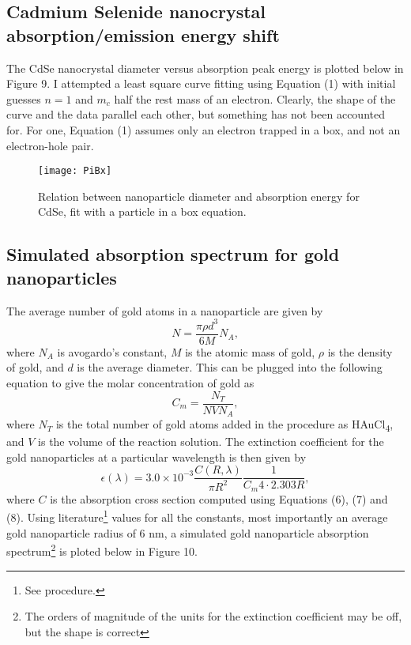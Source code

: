 \documentclass{article}
\begin{document}
\subsection{Cadmium Selenide nanocrystal absorption/emission energy shift}

The CdSe nanocrystal diameter versus absorption peak energy is plotted below in Figure 9.
I attempted a least square curve fitting using Equation (1) with initial guesses $n=1$ and
$m_c$ half the rest mass of an electron. Clearly, the shape of the curve and the data
parallel each other, but something has not been accounted for. For one, Equation (1) assumes
only an electron trapped in a box, and not an electron-hole pair.

\begin{figure}[H]
\texttt{[image: PiBx]}
\centering
\caption{Relation between nanoparticle diameter and absorption energy for CdSe, fit with
a particle in a box equation.}
\end{figure}

\subsection{Simulated absorption spectrum for gold nanoparticles}

The average number of gold atoms in a nanoparticle are given by
\begin{equation}
N=\frac{\pi\rho d^3}{6 M} N_A,
\end{equation}
where $N_A$ is avogardo's constant, $M$ is the atomic mass of gold, $\rho$ is the density
of gold, and $d$ is the average diameter. This can be plugged into the following equation
to give the molar concentration of gold as
\begin{equation}
C_m=\frac{N_T}{N V N_A},
\end{equation}
where $N_T$ is the total number of gold atoms added in the procedure as
HAuCl\textsubscript{4}, and $V$ is the volume of the reaction solution.
The extinction coefficient for the gold nanoparticles at a particular wavelength is
then given by
\begin{equation}
\epsilon(\lambda)=3.0\times10^{-3} \frac{C(R,\lambda)}{\pi R^2}
\frac{1}{C_m 4\cdot2.303 R},
\end{equation}
where $C$ is the absorption cross section computed using Equations (6), (7) and (8).
Using literature\footnote{See procedure.} values for all the constants, most importantly an 
average gold nanoparticle
radius of 6 nm, a simulated gold nanoparticle absorption spectrum\footnote{The orders of
magnitude of the units for the extinction coefficient may be off, but the shape is correct}
 is ploted below in  Figure 10.
\end{document}

